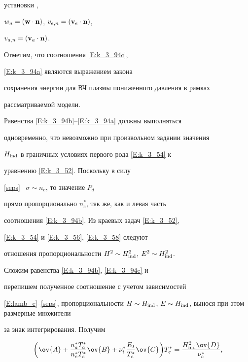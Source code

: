 установки \cite{my_book},


$w_n=(\bold w \cdot \bold n)$, $v_{e,n}=(\bold v_e \cdot\bold n)$,


$v_{a,n}=(\bold v_a \cdot \bold n)$.


Отметим, что соотношения \eqref{E:k_3_94c}, 


\eqref{E:k_3_94a} являются выражением закона


сохранения энергии для ВЧ плазмы пониженного давления в рамках


рассматриваемой модели.








Равенства \eqref{E:k_3_94b}--\eqref{E:k_3_94a} должны выполняться


одновременно, что невозможно при произвольном задании значения


$H_{\operatorname{ind}}$ в граничных условиях первого рода \eqref{E:k_3_54} к


уравнению \eqref{E:k_3_52}. Поскольку в силу 


\eqref{seps} \ $\sigma\sim n_e$, то значение $P_d$


прямо пропорционально $n_e^\ast$, так же, как и левая часть


соотношения \eqref{E:k_3_94b}. Из краевых задач \eqref{E:k_3_52},


\eqref{E:k_3_54} и \eqref{E:k_3_56}, \eqref{E:k_3_58} следуют


отношения пропорциональности $H^2 \sim H_{\ind}^2$, $E^2 \sim


H_{\ind}^2$.





Сложим равенства \eqref{E:k_3_94b}, \eqref{E:k_3_94c} и


перепишем полученное соотношение с учетом зависимостей


\eqref{E:lamb_e}--\eqref{seps}, пропорциональности $H \sim


H_{\ind}$, $E \sim H_{\ind}$, вынося при этом размерные множители


за знак интегрирования. Получим


\begin{equation}


\bigg(\ov{A}+\frac{n_a^\ast T_a^\ast}{n_e^\ast T_e^\ast}\ov{B}+


\nu_i ^\ast \frac{E_I}{T_e^\ast}\ov{C}\bigg)


T_e^\ast=\frac{H_{\ind}^2 \ov{D}}{\nu_c ^\ast},\label{E:k_3_94f}


\end{equation}


